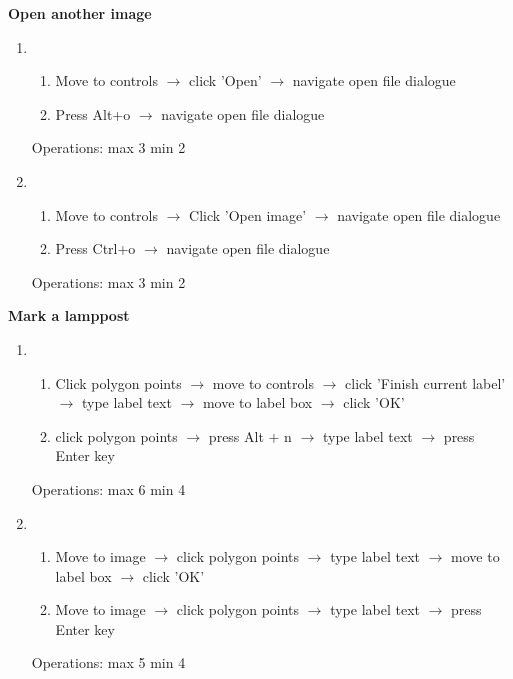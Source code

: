 \documentclass[a4paper,11pt,oneside]{article}
\begin{document}
{\bf Open another image}
\begin{enumerate}
    \item
    \begin{enumerate}
        \item Move to controls $\rightarrow$ click 'Open' $\rightarrow$ navigate open file dialogue
        \item Press Alt+o $\rightarrow$ navigate open file dialogue
    \end{enumerate}
    Operations: max 3 min 2
    \item
    \begin{enumerate}
        \item Move to controls $\rightarrow$ Click 'Open image' $\rightarrow$ navigate open file dialogue
        \item Press Ctrl+o $\rightarrow$ navigate open file dialogue
    \end{enumerate}
    Operations: max 3 min 2
\end{enumerate}

{\bf Mark a lamppost}
\begin{enumerate}
    \item
    \begin{enumerate}
        \item Click polygon points $\rightarrow$ move to controls $\rightarrow$ click 'Finish current label' $\rightarrow$ type label text $\rightarrow$ move to label box $\rightarrow$ click 'OK'
        \item click polygon points $\rightarrow$ press Alt + n $\rightarrow$ type label text $\rightarrow$ press Enter key
    \end{enumerate}
    Operations: max 6 min 4
    \item
    \begin{enumerate}
        \item Move to image $\rightarrow$ click polygon points $\rightarrow$ type label text $\rightarrow$ move to label box $\rightarrow$ click 'OK'
        \item Move to image $\rightarrow$ click polygon points $\rightarrow$ type label text $\rightarrow$ press Enter key
    \end{enumerate}
    Operations: max 5 min 4
\end{enumerate}
\end{document}
